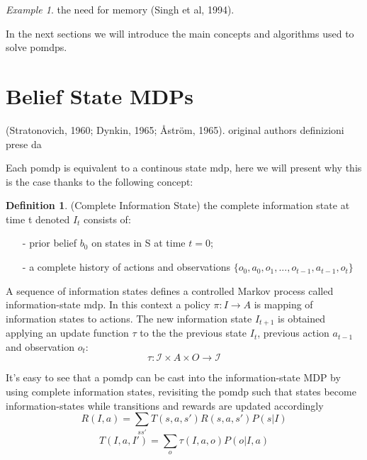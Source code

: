 \documentclass[a4paper,11pt]{report}
\theoremstyle{definition}
\newtheorem{definition}{Definition}[section]
\theoremstyle{plain}
\theoremstyle{remark}  %
\newtheorem{example}{Example}[section]
\begin{document}
\begin{example}
    the need for memory (Singh et al, 1994).
\end{example}


In the next sections we will introduce the main concepts and algorithms used to solve \gls{pomdp}s.

\section{Belief State MDPs}
(Stratonovich, 1960; Dynkin, 1965; Åström, 1965). original authors
\cite{Hauskrecht_2000} definizioni prese da


Each \gls{pomdp} is equivalent to a continous state \gls{mdp}, here we will present why this is the case 
thanks to the following concept: 
\begin{definition}
    (Complete Information State) the complete information state at time t denoted
    $I_t$ consists of:
    \begin{itemize}
        \item[-] prior belief $b_0$ on states in S at time $t=0$;
        \item[-] a complete history of actions and observations $\{o_0,a_0,o_1, ..., o_{t-1},a_{t-1},o_t\}$
    \end{itemize}
\end{definition}

A sequence of information states defines a controlled Markov process called 
information-state \gls{mdp}. In this context a policy $\pi: I \rightarrow A$ is mapping of 
information states to actions.
The new information state $I_{t+1}$ is obtained applying an update function $\tau$ to the
the previous state $I_t$, previous action $a_{t-1}$  and  observation $o_t$:
$$\tau: \mathcal{I} \times A \times O \rightarrow \mathcal{I}$$

It's easy to see that a \gls{pomdp} can be cast into the information-state MDP by using complete 
information states, revisiting the pomdp such that states become information-states while transitions 
and rewards are updated accordingly
$$R(I,a) = \sum_{s s'} T(s,a,s')R(s,a,s')P(s|I) $$
$$T(I,a,I') = \sum_o \tau(I,a,o)P(o|I,a) $$
\end{document}
